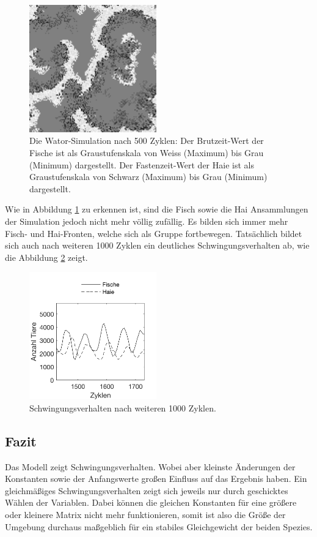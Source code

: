 \documentclass[a4paper,twoside]{article}
\begin{document}
	\begin{figure}[!h]
  		\centering
 		\includegraphics[width=5.5cm]{Diagramme/wator_image_100.png}
  		\caption{Die Wator-Simulation nach 500 Zyklen: Der Brutzeit-Wert der Fische ist als Graustufenskala von Weiss (Maximum) bis Grau (Minimum) dargestellt. Der Fastenzeit-Wert der Haie ist als Graustufenskala von Schwarz (Maximum) bis Grau (Minimum) dargestellt. }
  		\label{fig:wator_image_100}
	\end{figure}
	
	Wie in Abbildung \ref{fig:wator_image_100} zu erkennen ist, sind die Fisch sowie die Hai Ansammlungen der Simulation jedoch nicht mehr völlig zufällig. Es bilden sich immer mehr Fisch- und Hai-Fronten, welche sich als Gruppe fortbewegen. Tatsächlich bildet sich auch nach weiteren 1000 Zyklen ein deutliches Schwingungsverhalten ab, wie die Abbildung \ref{fig:wator_diagram_348} zeigt.
	\begin{figure}[!h]
  		\centering
 		\includegraphics[width=5.5cm]{Diagramme/wator_diagram_348.png}
  		\caption{Schwingungsverhalten nach weiteren 1000 Zyklen.}
  		\label{fig:wator_diagram_348}
	\end{figure}

	\newpage

	\subsection{Fazit}
	Das Modell zeigt Schwingungsverhalten. Wobei aber kleinste Änderungen der Konstanten sowie der Anfangswerte großen Einfluss auf das Ergebnis haben. Ein gleichmäßiges Schwingungsverhalten zeigt sich jeweils nur durch geschicktes Wählen der Variablen. Dabei können die gleichen Konstanten für eine größere oder kleinere Matrix nicht mehr funktionieren, somit ist also die Größe der Umgebung durchaus maßgeblich für ein stabiles Gleichgewicht der beiden Spezies.
	
\end{document}
